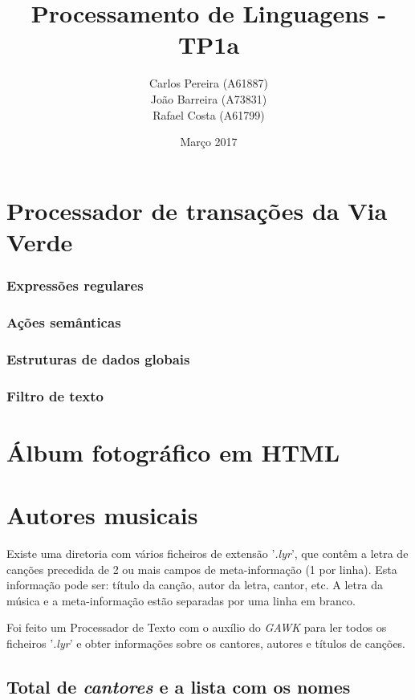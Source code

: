 \documentclass{article}
\title{\textbf{Processamento de Linguagens - TP1a}}
\author{\begin{tabular}{c}
	    	Carlos Pereira (A61887) \\ João Barreira (A73831) \\ Rafael Costa (A61799)
	    \end{tabular}}
\date{Março 2017}
\begin{document}
\maketitle

\section{Processador de transações da Via Verde}

\subsubsection{Expressões regulares}

\subsubsection{Ações semânticas}

\subsubsection{Estruturas de dados globais}

\subsubsection{Filtro de texto}



\section{Álbum fotográfico em HTML}

\section{Autores musicais}

Existe uma diretoria com vários ficheiros de extensão '\emph{.lyr}', que contêm a letra de canções precedida de 2 ou mais campos de meta-informação (1 por linha). Esta informação pode ser: título da canção, autor da letra, cantor, etc. A letra da música e a meta-informação estão separadas por uma linha em branco.

Foi feito um Processador de Texto com o auxílio do \emph{GAWK} para ler todos os ficheiros '\emph{.lyr}' e obter informações sobre os cantores, autores e títulos de canções.

\subsection{Total de \emph{cantores} e a lista com os nomes}
\end{document}
